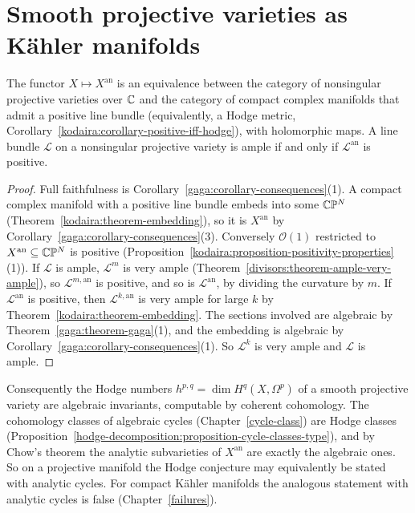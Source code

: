 \section{Smooth projective varieties as K\"ahler manifolds}\label{gaga:section-kahler}

\begin{theorem}\label{gaga:theorem-projective-kahler}
The functor $X \mapsto X^{\mathrm{an}}$ is an equivalence between the category of nonsingular projective varieties over $\mathbb{C}$ and the category of compact complex manifolds that
admit a positive line bundle (equivalently, a Hodge metric, Corollary~\ref{kodaira:corollary-positive-iff-hodge}), with holomorphic maps. A line bundle $\mathcal{L}$ on a
nonsingular projective variety is ample if and only if $\mathcal{L}^{\mathrm{an}}$ is positive.
\end{theorem}

\begin{proof}
Full faithfulness is Corollary~\ref{gaga:corollary-consequences}(1). A compact complex manifold with a positive line bundle embeds into some $\mathbb{C}\mathbb{P}^N$
(Theorem~\ref{kodaira:theorem-embedding}), so it is $X^{\mathrm{an}}$ by Corollary~\ref{gaga:corollary-consequences}(3). Conversely $\mathcal{O}(1)$ restricted to
$X^{\mathrm{an}} \subseteq \mathbb{C}\mathbb{P}^N$ is positive (Proposition~\ref{kodaira:proposition-positivity-properties}(1)). If $\mathcal{L}$ is ample, $\mathcal{L}^m$ is very ample
(Theorem~\ref{divisors:theorem-ample-very-ample}), so $\mathcal{L}^{m,\mathrm{an}}$ is positive, and so is $\mathcal{L}^{\mathrm{an}}$, by dividing the curvature by $m$. If
$\mathcal{L}^{\mathrm{an}}$ is positive, then $\mathcal{L}^{k,\mathrm{an}}$ is very ample for large $k$ by Theorem~\ref{kodaira:theorem-embedding}. The sections involved are
algebraic by Theorem~\ref{gaga:theorem-gaga}(1), and the embedding is algebraic by Corollary~\ref{gaga:corollary-consequences}(1). So $\mathcal{L}^k$ is very ample and
$\mathcal{L}$ is ample.
\end{proof}

\begin{remark}\label{gaga:remark-algebraic-invariants}
Consequently the Hodge numbers $h^{p,q} = \dim H^q(X, \Omega^p)$ of a smooth projective variety are algebraic invariants, computable by coherent cohomology. The cohomology
classes of algebraic cycles (Chapter~\ref{cycle-class}) are Hodge classes (Proposition~\ref{hodge-decomposition:proposition-cycle-classes-type}), and by Chow's theorem
the analytic subvarieties of $X^{\mathrm{an}}$ are exactly the algebraic ones. So on a projective manifold the Hodge conjecture may equivalently be stated with analytic
cycles. For compact K\"ahler manifolds the analogous statement with analytic cycles is false (Chapter~\ref{failures}).
\end{remark}

